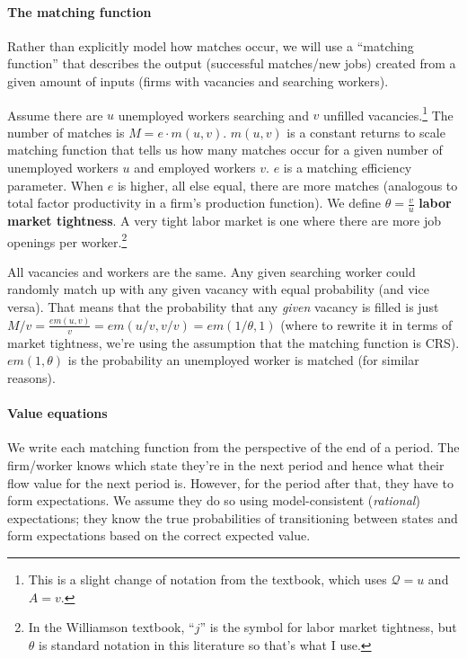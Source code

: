 \documentclass[12pt]{article}
\begin{document}
\paragraph{The matching function} Rather than explicitly model how matches occur, we will use a ``matching function'' that describes the output (successful matches/new jobs) created from a given amount of inputs (firms with vacancies and searching workers).


Assume there are $u$ unemployed workers searching and $v$ unfilled vacancies.\footnote{This is a slight change of notation from the textbook, which uses $\mathcal{Q} = u$ and $A = v$.} The number of matches is $M = e \cdot m(u,v)$.  $m(u,v)$ is a constant returns to scale matching function that tells us how many matches occur for a given number of unemployed workers $u$ and employed workers $v$.   $e$ is a matching efficiency parameter. When $e$ is higher, all else equal, there are more matches (analogous to total factor productivity in a firm's production function).  We define $\theta = \frac{v}{u}$ \textbf{labor market tightness}. A very tight labor market is one where there are more job openings per worker.\footnote{In the Williamson textbook,  ``$j$'' is the symbol for labor market tightness, but $\theta$ is standard notation in this literature so that's what I use.}

All vacancies and workers are the same. Any given searching worker could randomly match up with any given vacancy with equal probability (and vice versa). That means that the probability that any \textit{given} vacancy is filled is just $M/v = \frac{e m(u,v)}{v} = em(u/v, v/v) = em(1/\theta,1)$ (where to rewrite it in terms of market tightness, we're using the assumption that the matching function is CRS). $em(1,\theta)$ is the probability an unemployed worker is matched (for similar reasons).  

\paragraph{Value equations} We write each matching function from the perspective of the end of a period.  The firm/worker knows which state they're in the next period and hence what their flow value for the next period is.  However, for the period after that, they have to form expectations.  We assume they do so using model-consistent (\textit{rational}) expectations; they know the true probabilities of transitioning between states and form expectations based on the correct expected value.  
\end{document}
